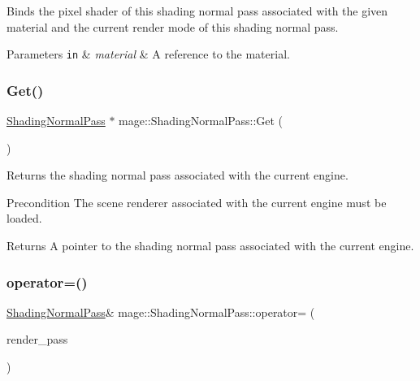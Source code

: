 Binds the pixel shader of this shading normal pass associated with the given material and the current render mode of this shading normal pass.


\begin{DoxyParams}[1]{Parameters}
\mbox{\tt in}  & {\em material} & A reference to the material. \\
\hline
\end{DoxyParams}
\hypertarget{classmage_1_1_shading_normal_pass_a27351f21b0e5d780b9c68e01f1428ace}{}\label{classmage_1_1_shading_normal_pass_a27351f21b0e5d780b9c68e01f1428ace} 
\subsubsection{\texorpdfstring{Get()}{Get()}}
{\footnotesize\ttfamily \hyperlink{classmage_1_1_shading_normal_pass}{Shading\+Normal\+Pass} $\ast$ mage\+::\+Shading\+Normal\+Pass\+::\+Get (\begin{DoxyParamCaption}{ }\end{DoxyParamCaption})\hspace{0.3cm}{\ttfamily [static]}}

Returns the shading normal pass associated with the current engine.

\begin{DoxyPrecond}{Precondition}
The scene renderer associated with the current engine must be loaded. 
\end{DoxyPrecond}
\begin{DoxyReturn}{Returns}
A pointer to the shading normal pass associated with the current engine. 
\end{DoxyReturn}
\hypertarget{classmage_1_1_shading_normal_pass_afef400a6e3b00a43f6b6d3a3f34d43b7}{}\label{classmage_1_1_shading_normal_pass_afef400a6e3b00a43f6b6d3a3f34d43b7} 
\subsubsection{\texorpdfstring{operator=()}{operator=()}\hspace{0.1cm}{\footnotesize\ttfamily [1/2]}}
{\footnotesize\ttfamily \hyperlink{classmage_1_1_shading_normal_pass}{Shading\+Normal\+Pass}\& mage\+::\+Shading\+Normal\+Pass\+::operator= (\begin{DoxyParamCaption}\item[{const \hyperlink{classmage_1_1_shading_normal_pass}{Shading\+Normal\+Pass} \&}]{render\+\_\+pass }\end{DoxyParamCaption})\hspace{0.3cm}{\ttfamily [delete]}}

